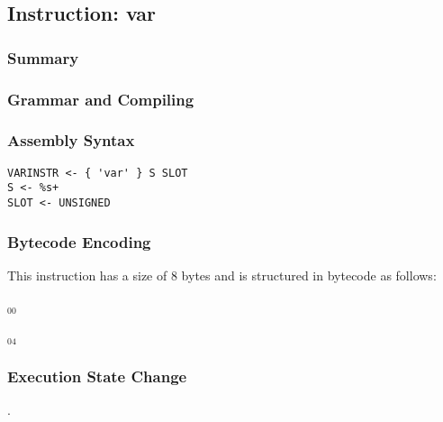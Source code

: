 \subsection{Instruction: var}

\subsubsection{Summary}


\subsubsection{Grammar and Compiling}


\subsubsection{Assembly Syntax}

\begin{myquote}
\begin{verbatim}
VARINSTR <- { 'var' } S SLOT
S <- %s+
SLOT <- UNSIGNED
\end{verbatim}
\end{myquote}


\subsubsection{Bytecode Encoding}

This instruction has a size of 8 bytes and is structured in bytecode as follows:

$_{00}$\ 



$_{04}$\ 


\subsubsection{Execution State Change}

.


